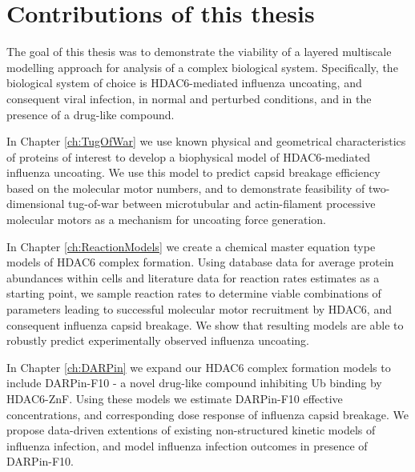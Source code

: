 \section{Contributions of this thesis}

The goal of this thesis was to demonstrate the viability of a layered multiscale modelling approach for analysis of a complex biological system. Specifically, the biological system of choice is HDAC6-mediated influenza uncoating, and consequent viral infection, in normal and perturbed conditions, and in the presence of a drug-like compound.

In Chapter \ref{ch:TugOfWar} we use known physical and geometrical characteristics of proteins of interest to develop a biophysical model of HDAC6-mediated influenza uncoating. We use this model to predict capsid breakage efficiency based on the molecular motor numbers, and to demonstrate feasibility of two-dimensional tug-of-war between microtubular and actin-filament processive molecular motors as a mechanism for uncoating force generation.

In Chapter \ref{ch:ReactionModels} we create a chemical master equation type models of HDAC6 complex formation. Using database data for average protein abundances within cells and literature data for reaction rates estimates as a starting point, we sample reaction rates to determine viable combinations of parameters leading to successful molecular motor recruitment by HDAC6, and consequent influenza capsid breakage. We show that resulting models are able to robustly predict experimentally observed influenza uncoating.

In Chapter \ref{ch:DARPin} we expand our HDAC6 complex formation models to include DARPin-F10 - a novel drug-like compound inhibiting Ub binding by HDAC6-ZnF. Using these models we estimate DARPin-F10 effective concentrations, and corresponding dose response of influenza capsid breakage. We propose data-driven extentions of existing non-structured kinetic models of influenza infection, and model influenza infection outcomes in presence of DARPin-F10.
